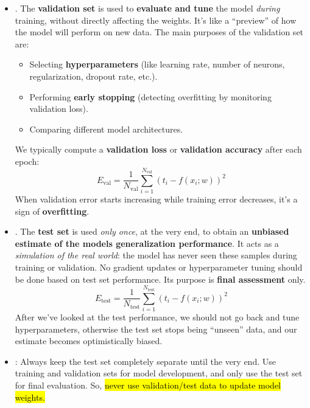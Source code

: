 \begin{itemize}
    \item {}. The \textbf{validation set} is used to \textbf{evaluate and tune} the model \emph{during} training, without directly affecting the weights. It's like a ``preview'' of how the model will perform on new data. The main purposes of the validation set are:
    \begin{itemize}
        \item Selecting \textbf{hyperparameters} (like learning rate, number of neurons, regularization, dropout rate, etc.).
        \item Performing \textbf{early stopping} (detecting overfitting by monitoring validation loss).
        \item Comparing different model architectures.
    \end{itemize}
    We typically compute a \textbf{validation loss} or \textbf{validation accuracy} after each epoch:
    \begin{equation*}
        E_{\text{val}} = \dfrac{1}{N_{\text{val}}} \sum_{i=1}^{N_{\text{val}}} \left(t_{i} - f\left(x_i; w\right)\right)^{2}
    \end{equation*}
    When validation error starts increasing while training error decreases, it's a sign of \textbf{overfitting}.

    \item {}. The \textbf{test set} is used \emph{only once}, at the very end, to obtain an \textbf{unbiased estimate of the models generalization performance}. It acts as a \emph{simulation of the real world}: the model has never seen these samples during training or validation. No gradient updates or hyperparameter tuning should be done based on test set performance. Its purpose is \textbf{final assessment} only.
    \begin{equation*}
        E_{\text{test}} = \dfrac{1}{N_{\text{test}}} \sum_{i=1}^{N_{\text{test}}} \left(t_{i} - f\left(x_i; w\right)\right)^{2}
    \end{equation*}
    After we've looked at the test performance, we should not go back and tune hyperparameters, otherwise the test set stops being ``unseen'' data, and our estimate becomes optimistically biased.

    \item {}: Always keep the test set completely separate until the very end. Use training and validation sets for model development, and only use the test set for final evaluation. So, \hl{never use validation/test data to update model weights.}
\end{itemize}

